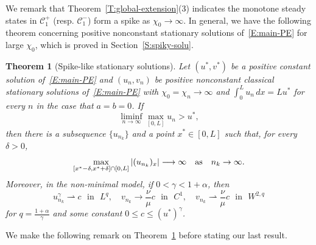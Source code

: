 \documentclass[11pt]{article} %
\newtheorem{theorem}{Theorem}[section] %
\theoremstyle{remark}
\theoremstyle{remark}
\numberwithin{equation}{section}
\numberwithin{figure}{section}
\numberwithin{table}{section}
\begin{document}
We remark that Theorem~\ref{T:global-extension}(3) indicates the monotone steady
states in $\mathcal{C}_1^+$ (resp. $\mathcal{C}_1^-$) form a spike as $\chi_0
\to \infty$. In general, we have the following theorem concerning positive
nonconstant stationary solutions of~\eqref{E:main-PE} for large $\chi_0$, which
is proved in Section~\ref{S:spiky-solu}.

\begin{theorem}[Spike-like stationary solutions]\label{T:spiky-solu-thm}
  Let $(u^*,v^*)$ be a positive constant solution of~\eqref{E:main-PE} and
  $(u_n,v_n)$ be positive nonconstant classical stationary solutions
  of~\eqref{E:main-PE} with $\chi_0 = \chi_n \to \infty$ and $\int_0^L u_n\,dx =
  Lu^*$ for every $n$ in the case that $a = b = 0$. If
  \[
    \liminf_{n\to\infty}\max_{[0,L]}u_n>u^*,
  \]
  then there is a subsequence $\{u_{n_k}\}$ and a point $x^* \in [0, L]$ such
  that, for every $\delta > 0$,
  \begin{equation}\label{E:spiky-thm-eq2}
    \max_{[x^*-\delta,x^*+\delta]\cap[0,L]}|(u_{n_k})_x|
    \longrightarrow\infty\quad {\rm as}\quad n_k\to\infty.
  \end{equation}
  Moreover, in the non-minimal model, if $0 < \gamma < 1 + \alpha$, then
  \begin{equation}\label{E:spiky-thm-eq3}
    u_{n_k}^\gamma\rightharpoonup c\,\,\text{ in }\,\, L^q,
    \quad v_{n_k}\to\frac\nu\mu c\,\, \text{ in }\,\, C^1,
    \quad v_{n_k}\rightharpoonup\frac\nu\mu c\,\, \text{ in }\,\, W^{2,q}
  \end{equation}
  for $q = \frac{1+\alpha}{\gamma}$ and some constant $0 \le c \le
  (u^*)^\gamma$.
\end{theorem}


We make the following remark on Theorem~\ref{T:spiky-solu-thm} before stating
our last result.
\end{document}
